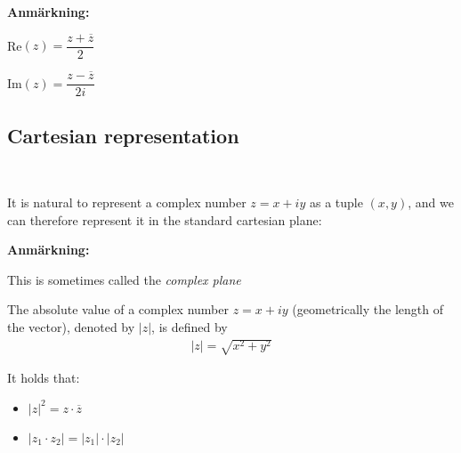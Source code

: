 \par\bigskip
\noindent\textbf{Anmärkning:}\par
\noindent Re$(z) = \dfrac{z+\overline{z}}{2}$\par
\noindent Im$(z) = \dfrac{z-\overline{z}}{2i}$
\par\bigskip
\subsection{Cartesian representation}\hfill\\\par
\noindent It is natural to represent a complex number $z = x+iy$ as a tuple $(x,y)$, and we can therefore represent it in the standard cartesian plane:

\begin{center}
\end{center}
\par\bigskip
\noindent\textbf{Anmärkning:}\par
\noindent This is sometimes called the \textit{complex plane}
\par\bigskip
\begin{theo}{}
  The absolute value of a complex number $z = x+iy$ (geometrically the length of the vector), denoted by $\left|z\right|$, is defined by
  \begin{equation*}
    \begin{gathered}
      \left|z\right| = \sqrt{x^2+y^2}
    \end{gathered}
  \end{equation*}
  \par\bigskip
  \noindent It holds that:\par
  \begin{itemize}
    \item $\left|z\right|^2 = z\cdot\overline{z}$
    \item $\left|z_1\cdot z_2\right| = \left|z_1\right|\cdot\left|z_2\right|$
  \end{itemize}
\end{theo}
